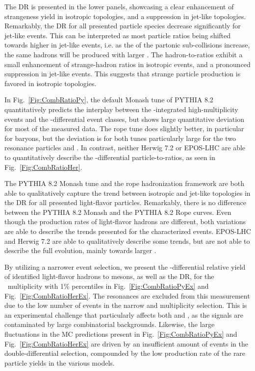 The DR is presented in the lower panels, showcasing a clear enhancement of strangeness yield in isotropic topologies, and a suppression in jet-like topologies. Remarkably, the DR for all presented particle species decrease significantly for jet-like events. This can be interpreted as most particle ratios being shifted towards higher \pt in jet-like events, i.e. as the \pt of the partonic sub-collisions increase, the same hadrons will be produced with larger \pt. The hadron-to-\PI ratios exhibit a small enhancement of strange-hadron ratios in isotropic events, and a pronounced suppression in jet-like events. This suggests that strange particle production is favored in isotropic topologies. 

In Fig.~\ref{Fig:CombRatioPy}, the default Monash tune of PYTHIA 8.2 quantitatively predicts the interplay between the \SOPT-integrated high-multiplicity events and the \SOPT-differential event classes, but shows large quantitative deviation for most of the measured data. The rope tune does slightly better, in particular for baryons, but the deviation is for both tunes particularly large for the two resonance particles \PHI and \KSTAR. In contrast, neither Herwig 7.2 or EPOS-LHC are able to quantitatively describe the \pt-differential particle-to-\PI ratios, as seen in Fig.~\ref{Fig:CombRatioHer}.

The PYTHIA 8.2 Monash tune and the rope hadronization framework are both able to qualitatively capture the trend between isotropic and jet-like topologies in the DR for all presented light-flavor particles. Remarkably, there is no difference between the PYTHIA 8.2 Monash and the PYTHIA 8.2 Rope curves. Even though the production rates of light-flavor hadrons are different, both variations are able to describe the trends presented for the \SOPT characterized events. EPOS-LHC and Herwig 7.2 are able to qualitatively describe some trends, but are not able to describe the full evolution, mainly towards larger \pt.

By utilizing a narrower event selection, we present the \pt-differential relative yield of identified light-flavor hadrons to \PI mesons, as well as the DR, for the \tracklet \topone ~multiplicity with 1\% \SOPT percentiles in Fig.~\ref{Fig:CombRatioPyEx} and Fig.~\ref{Fig:CombRatioHerEx}. The resonances are excluded from this measurement due to the low number of events in the narrow \SOPT and multiplicity selection. This is an experimental challenge that particularly affects both \PHI and \KSTAR, as the signals are contaminated by large combinatorial backgrounds. Likewise, the large fluctuations in the MC predictions present in Fig.~\ref{Fig:CombRatioPyEx} and Fig.~\ref{Fig:CombRatioHerEx} are driven by an insufficient amount of events in the double-differential selection, compounded by the low production rate of the rare particle yields in the various models.


